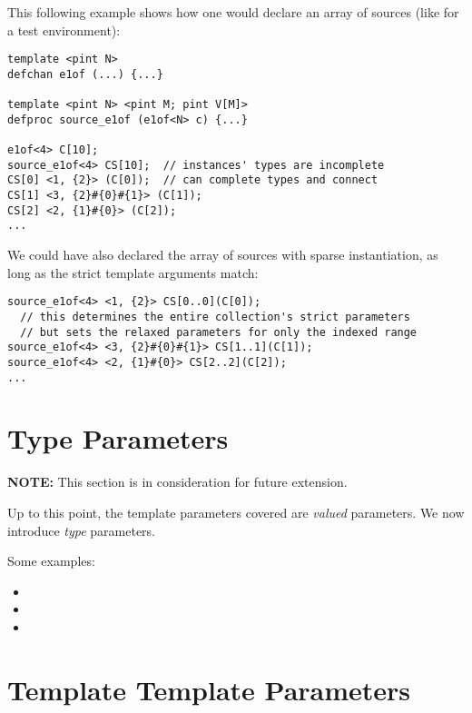This following example shows how one would declare an array of sources
(like for a test environment):

\begin{verbatim}
template <pint N>
defchan e1of (...) {...}

template <pint N> <pint M; pint V[M]>
defproc source_e1of (e1of<N> c) {...}

e1of<4> C[10];
source_e1of<4> CS[10];  // instances' types are incomplete
CS[0] <1, {2}> (C[0]);  // can complete types and connect
CS[1] <3, {2}#{0}#{1}> (C[1]);
CS[2] <2, {1}#{0}> (C[2]);
...
\end{verbatim}

We could have also declared the array of sources with sparse instantiation, 
as long as the strict template arguments match:
\begin{verbatim}
source_e1of<4> <1, {2}> CS[0..0](C[0]);
  // this determines the entire collection's strict parameters
  // but sets the relaxed parameters for only the indexed range
source_e1of<4> <3, {2}#{0}#{1}> CS[1..1](C[1]);
source_e1of<4> <2, {1}#{0}> CS[2..2](C[2]);
...
\end{verbatim}

\section{Type Parameters}
\label{sec:templates:typeparam}

\textbf{NOTE:} This section is in consideration for future extension.  

Up to this point, the template parameters covered are 
\emph{valued} parameters.  
We now introduce \emph{type} parameters.  

Some examples:

\begin{itemize}
\item {}
\item {}
\item {}
\end{itemize}


\section{Template Template Parameters}
\label{sec:templates:ttp}

